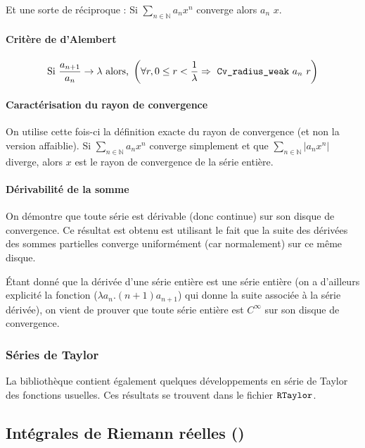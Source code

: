 Et une sorte de réciproque : Si $\sum_{n\in \mathbb{N}} a_n x^n$ converge alors  $a_n$ $x$.

\paragraph{Critère de d'Alembert} $$\text{Si } \frac{a_{n + 1}}{a_n} \rightarrow \lambda \text{ alors, } \left( \forall r, 0 \le r < \frac{1}{\lambda} \Rightarrow \text{ \texttt{Cv\_radius\_weak} } a_n~ r\right)$$

\paragraph{Caractérisation du rayon de convergence} On utilise cette fois-ci la définition exacte du rayon de convergence (et non la version affaiblie). Si $\sum_{n\in \mathbb{N}} a_n x^n$ converge simplement et que $\sum_{n\in \mathbb{N}} |a_n x^n|$ diverge, alors $x$ est le rayon de convergence de la série entière.

\paragraph{Dérivabilité de la somme} On démontre que toute série est dérivable (donc continue) sur son disque de convergence. Ce résultat est obtenu est utilisant le fait que la suite des dérivées des sommes partielles converge uniformément (car normalement) sur ce même disque.

Étant donné que la dérivée d'une série entière est une série entière (on a d'ailleurs explicité la fonction  ($\lambda a_n.(n+1)a_{n+1}$) qui donne la suite associée à la série dérivée), on vient de prouver que toute série entière est $C^{\infty}$ sur son disque de convergence.

\subsubsection{Séries de Taylor}

La bibliothèque contient également quelques développements en série de Taylor des fonctions usuelles. Ces résultats se trouvent dans le fichier $\texttt{RTaylor}$.

\subsection{Intégrales de Riemann réelles ()}

